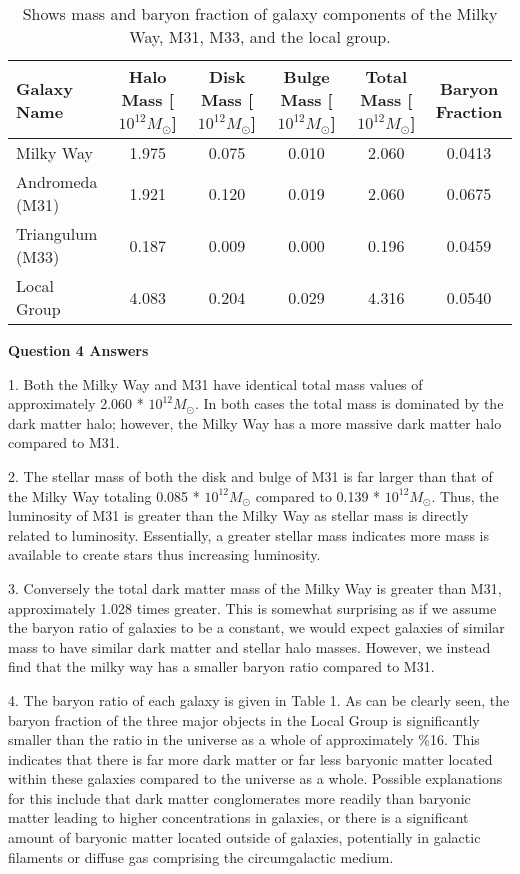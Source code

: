 \documentclass{article}
\begin{document}
\pagestyle{empty}

\begin{sidewaystable}[ht]
\centering
\small

\begin{tabular}{lccccc}
\hline \hline
Galaxy Name & Halo Mass [$10^{12} M_{\odot}$] & Disk Mass [$10^{12} M_{\odot}$] & Bulge Mass [$10^{12} M_{\odot}$] & Total Mass [$10^{12} M_{\odot}$] & Baryon Fraction \\
\hline
Milky Way & 1.975 & 0.075 & 0.010 & 2.060 & 0.0413 \\
Andromeda (M31) & 1.921 & 0.120 & 0.019 & 2.060 & 0.0675 \\
Triangulum (M33) & 0.187 & 0.009 & 0.000 & 0.196 & 0.0459 \\
\hline Local Group & 4.083 & 0.204 & 0.029 & 4.316 & 0.0540 \\
\hline
\end{tabular}
\caption{Shows mass and baryon fraction of galaxy components of the Milky Way, M31, M33, and the local group.}
\label{Table:1}
\end{sidewaystable}


\begin{center}
    {\Large \textbf{Question 4 Answers}}
\end{center}

1. Both the Milky Way and M31 have identical total mass values of approximately 2.060 * $10^{12} M_{\odot}$. In both cases the total mass is dominated by the dark matter halo; however, the Milky Way has a more massive dark matter halo compared to M31.\vspace{5mm}

2. The stellar mass of both the disk and bulge of M31 is far larger than that of the Milky Way totaling 0.085 * $10^{12} M_{\odot}$ compared to 0.139 * $10^{12} M_{\odot}$. Thus, the luminosity of M31 is greater than the Milky Way as stellar mass is directly related to luminosity. Essentially, a greater stellar mass indicates more mass is available to create stars thus increasing luminosity.\vspace{5mm}

3. Conversely the total dark matter mass of the Milky Way is greater than M31, approximately 1.028 times greater. This is somewhat surprising as if we assume the baryon ratio of galaxies to be a constant, we would expect galaxies of similar mass to have similar dark matter and stellar halo masses. However, we instead find that the milky way has a smaller baryon ratio compared to M31.\vspace{5mm}

4. The baryon ratio of each galaxy is given in Table 1. As can be clearly seen, the baryon fraction of the three major objects in the Local Group is significantly smaller than the ratio in the universe as a whole of approximately \%16. This indicates that there is far more dark matter or far less baryonic matter located within these galaxies compared to the universe as a whole. Possible explanations for this include that dark matter conglomerates more readily than baryonic matter leading to higher concentrations in galaxies, or there is a significant amount of baryonic matter located outside of galaxies, potentially in galactic filaments or diffuse gas comprising the circumgalactic medium. 
\end{document}
